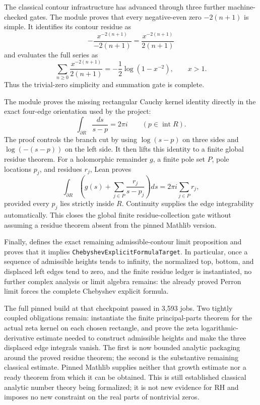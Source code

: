 \documentclass[11pt,a4paper]{article}
\newcommand{\code}[1]{\texttt{#1}}
\begin{document}
The classical contour infrastructure has advanced through three further
machine-checked gates.  The module
 proves that every negative-even
zero $-2(n+1)$ is simple.  It identifies its contour residue as
\[
  -\frac{x^{-2(n+1)}}{-2(n+1)}
  = \frac{x^{-2(n+1)}}{2(n+1)}
\]
and evaluates the full series as
\[
  \sum_{n\geq0}\frac{x^{-2(n+1)}}{2(n+1)}
  =-\frac12\log(1-x^{-2}), \qquad x>1.
\]
Thus the trivial-zero simplicity and summation gate is complete.

The module  proves the missing
rectangular Cauchy kernel identity directly in the exact four-edge orientation
used by the project:
\[
  \int_{\partial R}\frac{ds}{s-p}=2\pi i
  \qquad (p\in\operatorname{int}R).
\]
The proof controls the branch cut by using $\log(s-p)$ on three sides and
$\log(-(s-p))$ on the left side.  It then lifts this identity to a finite
global residue theorem.  For a holomorphic remainder $g$, a finite pole set
$P$, pole locations $p_j$, and residues $r_j$, Lean proves
\[
 \int_{\partial R}
 \left(g(s)+\sum_{j\in P}\frac{r_j}{s-p_j}\right)ds
 =2\pi i\sum_{j\in P}r_j,
\]
provided every $p_j$ lies strictly inside $R$.  Continuity supplies the edge
integrability automatically.  This closes the global finite residue-collection
gate without assuming a residue theorem absent from the pinned Mathlib version.

Finally,  defines the exact
remaining admissible-contour limit proposition and proves that it implies
\code{ChebyshevExplicitFormulaTarget}.  In particular, once a sequence of
admissible heights tends to infinity, the normalized top, bottom, and displaced
left edges tend to zero, and the finite residue ledger is instantiated, no
further complex analysis or limit algebra remains: the already proved Perron
limit forces the complete Chebyshev explicit formula.

The full pinned build at that checkpoint passed in 3,593 jobs.  Two tightly coupled obligations
remain: instantiate the finite principal-parts theorem for the actual zeta
kernel on each chosen rectangle, and prove the zeta logarithmic-derivative
estimate needed to construct admissible heights and make the three displaced
edge integrals vanish.  The first is now bounded analytic packaging around the
proved residue theorem; the second is the substantive remaining classical
estimate. Pinned Mathlib supplies neither that growth estimate nor a ready
theorem from which it can be obtained. This is still established classical
analytic number theory being formalized; it is not new evidence for RH and
imposes no new constraint on the real parts of nontrivial zeros.
\end{document}
